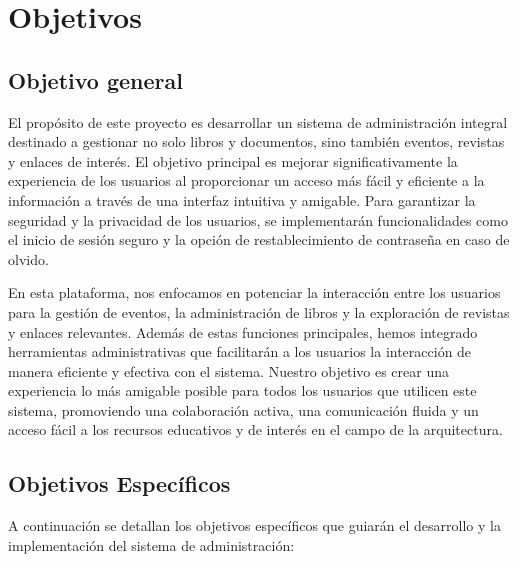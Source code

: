 \documentclass[a4paper, 12pt]{book}
\begin{document}

\cleardoublepage %
\chapter{Objetivos} %
\label{chap:objetivos} %

\section{Objetivo general} %
\label{sec:objetivo-general} %
El propósito de este proyecto es desarrollar un sistema de administración integral destinado a gestionar no solo libros y documentos, sino también eventos, revistas y enlaces de interés. El objetivo principal es mejorar significativamente la experiencia de los usuarios al proporcionar un acceso más fácil y eficiente a la información a través de una interfaz intuitiva y amigable. Para garantizar la seguridad y la privacidad de los usuarios, se implementarán funcionalidades como el inicio de sesión seguro y la opción de restablecimiento de contraseña en caso de olvido.

En esta plataforma, nos enfocamos en potenciar la interacción entre los usuarios para la gestión de eventos, la administración de libros y la exploración de revistas y enlaces relevantes. Además de estas funciones principales, hemos integrado herramientas administrativas que facilitarán a los usuarios la interacción de manera eficiente y efectiva con el sistema. Nuestro objetivo es crear una experiencia lo más amigable posible para todos los usuarios que utilicen este sistema, promoviendo una colaboración activa, una comunicación fluida y un acceso fácil a los recursos educativos y de interés en el campo de la arquitectura.

\section{Objetivos Específicos}
\label{sec:objetivos-especificos}

A continuación se detallan los objetivos específicos que guiarán el desarrollo y la implementación del sistema de administración:
\end{document}

